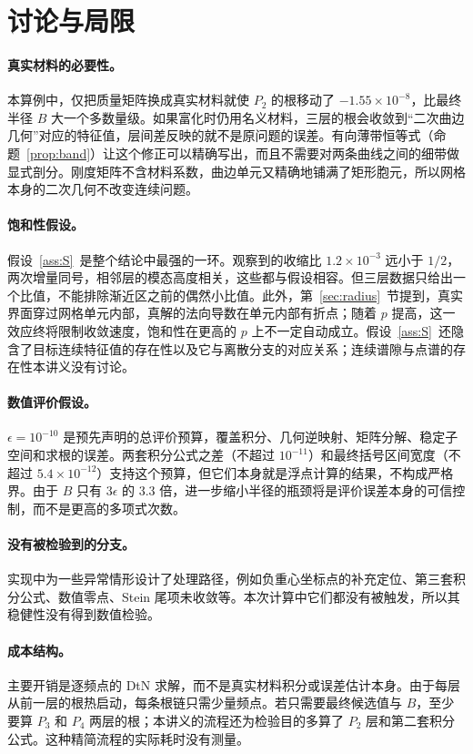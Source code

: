 \documentclass[11pt,a4paper,fontset=fandol]{ctexart}
\begin{document}
\section{讨论与局限}
\label{sec:discussion}

\paragraph{真实材料的必要性。} 本算例中，仅把质量矩阵换成真实材料就使 $P_2$ 的根移动了 $-1.55\times10^{-8}$，比最终半径 $B$ 大一个多数量级。如果富化时仍用名义材料，三层的根会收敛到“二次曲边几何”对应的特征值，层间差反映的就不是原问题的误差。有向薄带恒等式（命题~\ref{prop:band}）让这个修正可以精确写出，而且不需要对两条曲线之间的细带做显式剖分。刚度矩阵不含材料系数，曲边单元又精确地铺满了矩形胞元，所以网格本身的二次几何不改变连续问题。

\paragraph{饱和性假设。} 假设~\ref{ass:S}~是整个结论中最强的一环。观察到的收缩比 $1.2\times10^{-3}$ 远小于 $1/2$，两次增量同号，相邻层的模态高度相关，这些都与假设相容。但三层数据只给出一个比值，不能排除渐近区之前的偶然小比值。此外，第~\ref{sec:radius}~节提到，真实界面穿过网格单元内部，真解的法向导数在单元内部有折点；随着 $p$ 提高，这一效应终将限制收敛速度，饱和性在更高的 $p$ 上不一定自动成立。假设~\ref{ass:S}~还隐含了目标连续特征值的存在性以及它与离散分支的对应关系；连续谱隙与点谱的存在性本讲义没有讨论。

\paragraph{数值评价假设。} $\epsilon=10^{-10}$ 是预先声明的总评价预算，覆盖积分、几何逆映射、矩阵分解、稳定子空间和求根的误差。两套积分公式之差（不超过 $10^{-11}$）和最终括号区间宽度（不超过 $5.4\times10^{-12}$）支持这个预算，但它们本身就是浮点计算的结果，不构成严格界。由于 $B$ 只有 $3\epsilon$ 的 3.3 倍，进一步缩小半径的瓶颈将是评价误差本身的可信控制，而不是更高的多项式次数。

\paragraph{没有被检验到的分支。} 实现中为一些异常情形设计了处理路径，例如负重心坐标点的补充定位、第三套积分公式、数值零点、Stein 尾项未收敛等。本次计算中它们都没有被触发，所以其稳健性没有得到数值检验。

\paragraph{成本结构。} 主要开销是逐频点的 DtN 求解，而不是真实材料积分或误差估计本身。由于每层从前一层的根热启动，每条根链只需少量频点。若只需要最终候选值与 $B$，至少要算 $P_3$ 和 $P_4$ 两层的根；本讲义的流程还为检验目的多算了 $P_2$ 层和第二套积分公式。这种精简流程的实际耗时没有测量。
\end{document}
